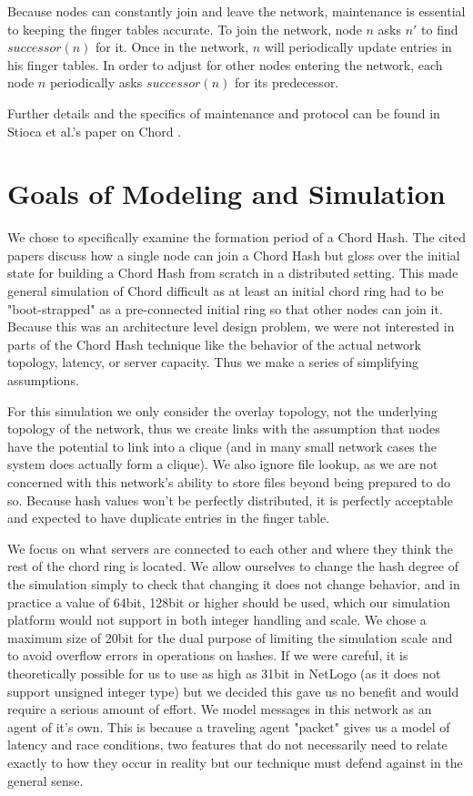 \documentclass[12pt]{ieeetran} %
\begin{document}
Because nodes can constantly join and leave the network, maintenance is essential to keeping the finger tables accurate.  To join the network, node $n$ asks $n'$ to find $successor(n)$ for it.  Once in the network, $n$ will periodically update entries in his finger tables.  In order to adjust for other nodes entering the network, each node $n$ periodically asks $successor(n)$ for its predecessor. 

Further details and the specifics of maintenance and protocol can be found in Stioca et al.'s paper on Chord \cite{Chord}.



\section{Goals of Modeling and Simulation}
We chose to specifically examine the formation period of a Chord Hash. The cited papers discuss how a single node can join a Chord Hash but gloss over the initial state for building a Chord Hash from scratch in a distributed setting. This made general simulation of Chord difficult as at least an initial chord ring had to be "boot-strapped" as a pre-connected initial ring so that other nodes can join it. Because this was an architecture level design problem, we were not interested in parts of the Chord Hash technique like the behavior of the actual network topology, latency, or server capacity. Thus we make a series of simplifying assumptions. 

For this simulation we only consider the overlay topology, not the underlying topology of the network, thus we create links with the assumption that nodes have the potential to link into a clique (and in many small network cases the system does actually form a clique). We also ignore file lookup, as we are not concerned with this network's ability to store files beyond being prepared to do so. Because hash values won't be perfectly distributed, it is perfectly acceptable and expected to have duplicate entries in the finger table. 

We focus on what servers are connected to each other and where they think the rest of the chord ring is located. We allow ourselves to change the hash degree of the simulation simply to check that changing it does not change behavior, and in practice a value of 64bit, 128bit or higher should be used, which our simulation platform would not support in both integer handling and scale. We chose a maximum size of 20bit for the dual purpose of limiting the simulation scale and to avoid overflow errors in operations on hashes. If we were careful, it is theoretically possible for us to use as high as 31bit in NetLogo (as it does not support unsigned integer type) but we decided this gave us no benefit and would require a serious amount of effort. We model messages in this network as an agent of it's own. This is because a traveling agent "packet" gives us a model of latency and race conditions, two features that do not necessarily need to relate exactly to how they occur in reality but our technique must defend against in the general sense.
\end{document}
